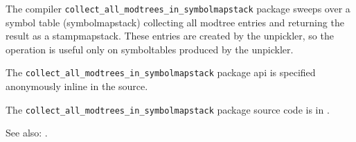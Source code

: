 
The compiler {\tt collect\_all\_modtrees\_in\_symbolmapstack} package sweeps over a symbol table 
(symbolmapstack) collecting all modtree entries and returning the result as a stampmapstack.
These entries are created by the unpickler, so the operation is useful only on symboltables 
produced by the unpickler.

The {\tt collect\_all\_modtrees\_in\_symbolmapstack} package api is specified anonymously inline in the source.

The {\tt collect\_all\_modtrees\_in\_symbolmapstack} package source code is in .


See also:  .






